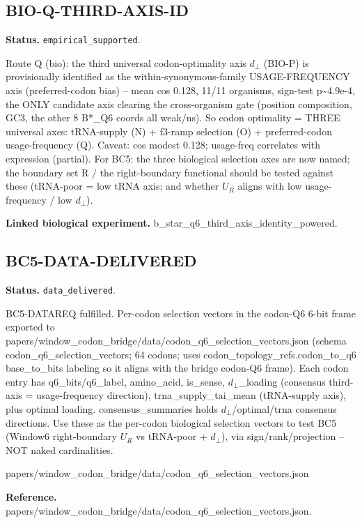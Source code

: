 \subsection{BIO-Q-THIRD-AXIS-ID}
\textbf{Status.} \texttt{empirical\_supported}.

Route Q (bio): the third universal codon-optimality axis $d_{\perp}$ (BIO-P) is provisionally
identified as the within-synonymous-family USAGE-FREQUENCY axis (preferred-codon bias) -- mean cos
0.128, 11/11 organisms, sign-test p\textasciitilde{}4.9e-4, the ONLY candidate axis clearing the
cross-organism gate (position composition, GC3, the other 8 B*\_Q6 coords all weak/ns). So codon
optimality = THREE universal axes: tRNA-supply (N) + f3-ramp selection (O) + preferred-codon
usage-frequency (Q). Caveat: cos modest 0.128; usage-freq correlates with expression (partial). For
BC5: the three biological selection axes are now named; the boundary set R / the right-boundary
functional should be tested against these (tRNA-poor = low tRNA axis; and whether $U_R$ aligns with
low usage-frequency / low $d_{\perp}$).

\textbf{Linked biological experiment.} b\_star\_q6\_third\_axis\_identity\_powered.

\subsection{BC5-DATA-DELIVERED}
\textbf{Status.} \texttt{data\_delivered}.

BC5-DATAREQ fulfilled. Per-codon selection vectors in the codon-Q6 6-bit frame exported to
papers/window\_codon\_bridge/data/codon\_q6\_selection\_vectors.json (schema
codon\_q6\_selection\_vectors; 64 codons; uses codon\_topology\_refs.codon\_to\_q6 base\_to\_bits
labeling so it aligns with the bridge codon-Q6 frame). Each codon entry has q6\_bits/q6\_label,
amino\_acid, is\_sense, $d_{\perp}$\_loading (consensus third-axis = usage-frequency direction),
trna\_supply\_tai\_mean (tRNA-supply axis), plus optimal loading. consensus\_summaries holds
$d_{\perp}$/optimal/trna consensus directions. Use these as the per-codon biological selection
vectors to test BC5 (Window6 right-boundary $U_R$ vs tRNA-poor + $d_{\perp}$), via
sign/rank/projection -- NOT naked cardinalities.

papers/window\_codon\_bridge/data/codon\_q6\_selection\_vectors.json

\textbf{Reference.} papers/window\_codon\_bridge/data/codon\_q6\_selection\_vectors.json.

